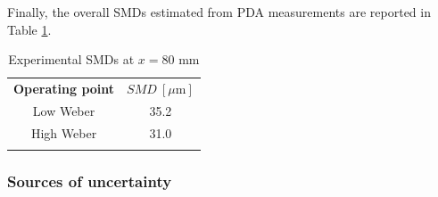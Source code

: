 \clearpage

Finally, the overall SMDs estimated from PDA measurements are reported in Table \ref{tab:becker_hassa_SMD_values_sprays}.


\begin{table}[!h]
\centering
\caption{Experimental SMDs at $x = 80$ mm  }
\vspace*{-0.1in}
\begin{tabular}{cc}
\thickhline
\textbf{Operating point} & $SMD~\left[ \mu \mathrm{m}\right]$  \\
\thickhline
Low Weber & 35.2  \\  
High Weber & 31.0 \\
\thickhline
\end{tabular}
\label{tab:becker_hassa_SMD_values_sprays}
\end{table}

\vspace*{-0.3in}

\subsubsection*{Sources of uncertainty}


